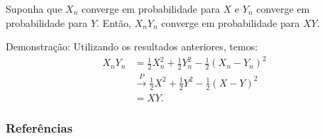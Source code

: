 \documentclass[12pt]{beamer}
\begin{document}
\begin{frame}{}
\begin{Teorema}
\justifying
Suponha que $X_{n}$ converge em probabilidade para $X$ e $Y_{n}$ converge em probabilidade para $Y$. Então, $X_{n}Y_{n}$ converge em probabilidade para $XY$.
\end{Teorema}
\begin{block}{Demonstração:}
\justifying
Utilizando os resultados anteriores, temos:
\begin{align*}
    X_{n}Y_{n} &= \frac{1}{2}X^{2}_{n} + \frac{1}{2}Y^{2}_{n} - \frac{1}{2}(X_{n} - Y_{n})^{2}\\  
    &\xrightarrow{P} \frac{1}{2}X^2 + \frac{1}{2}Y^2 - \frac{1}{2}(X - Y)^{2}\\ 
    &= XY.
\end{align*}
\end{block}
\end{frame}

\begin{frame}[allowframebreaks]
\frametitle{\bf Referências}
\printbibliography
\end{frame}
\end{document}
